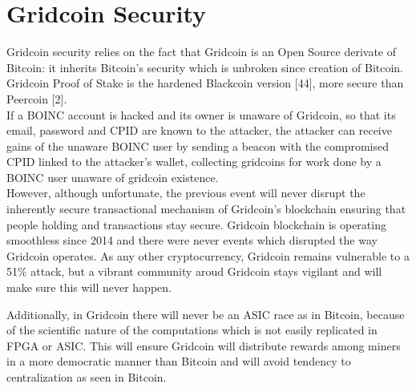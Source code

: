 \section{Gridcoin Security}

Gridcoin security relies on the fact that Gridcoin is an Open Source derivate of Bitcoin: it inherits Bitcoin's security which is unbroken since creation of Bitcoin. Gridcoin Proof of Stake is the hardened Blackcoin version [44], more secure than Peercoin [2].\\ 

If a BOINC account is hacked and its owner is unaware of Gridcoin, so that its email, password and CPID are known to the attacker, the attacker can receive gains of the unaware BOINC user by sending a beacon with the compromised CPID linked to the attacker's wallet, collecting gridcoins for work done by a BOINC user unaware of gridcoin existence.\\

However, although unfortunate, the previous event will never disrupt the inherently secure transactional mechanism of Gridcoin's blockchain ensuring that people holding and transactions stay secure. Gridcoin blockchain is operating smoothless since 2014 and there were never events which disrupted the way Gridcoin operates. As any other cryptocurrency, Gridcoin remains vulnerable to a 51\% attack, but a vibrant community aroud Gridcoin stays vigilant and will make sure this will never happen.

Additionally, in Gridcoin there will never be an ASIC race as in Bitcoin, because of the scientific nature of the computations which is not easily replicated in FPGA or ASIC. This will ensure Gridcoin will distribute rewards among miners in a more democratic manner than Bitcoin and will avoid tendency to centralization as seen in Bitcoin.